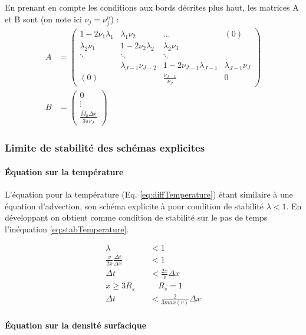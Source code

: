 \documentclass[a4paper,12pt]{article}
\begin{document}
En prenant en compte les conditions aux bords décrites plus haut, les matrices A et B sont (on note ici $\nu_j = \nu^n_j$) :  
\begin{align}
A&= \begin{pmatrix} 1 - 2\nu_1\lambda_1& \lambda_1\nu_2 & \ldots & (0) \\
	\lambda_2\nu_1 & 1 - 2\nu_2\lambda_2 & \lambda_2\nu_3 & \\
	 \ddots& \ddots& \ddots &\\
	  & \lambda_{J-1}\nu_{J-2} & 1 - 2\nu_{J-1}\lambda_{J-1} & \lambda_{J-1}\nu_{J}\\
	  (0) &  &  \frac{\nu_{J-1}}{\nu_J} & 0
\end{pmatrix}\\
 B &= \begin{pmatrix}  0\\
	\vdots\\
	\frac{\dot{M_0}\Delta x}{3\pi\nu_J}
\end{pmatrix}
\end{align}

\subsubsection{Limite de stabilité des schémas explicites}

\paragraph{Équation sur la température}

L'équation pour la température (Eq. \ref{eq:diffTemperature}) étant similaire à une équation d'advection, son schéma explicite à pour condition de stabilité $\lambda < 1$. En développant on obtient comme condition de stabilité sur le pas de temps l'inéquation \ref{eq:stabTemperature}.

\begin{align}
	\lambda &< 1 \\
	\frac{v}{2 x} \frac{\Delta t}{\Delta x} &< 1 \\
	\Delta t &< \frac{2 x}{v} \Delta x \\
	x \geq 3 R_s \quad & \quad R_s = 1 \\
	\Delta t &< \frac{2}{3 max(v)} \Delta x \label{eq:stabTemperature}	
\end{align}

\paragraph{Équation sur la densité surfacique}
\end{document}
